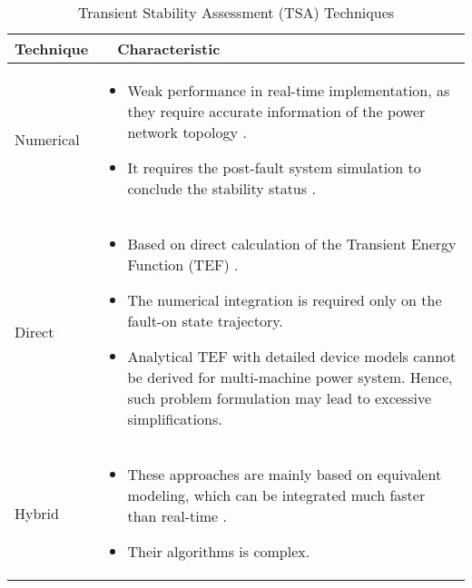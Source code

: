 \documentclass[journal]{IEEEtran}
\begin{document}
\begin{table*}[t]
\centering
	 \caption{Transient Stability Assessment (TSA) Techniques}
	 \footnotesize
\begin{tabular}{ p{0.35in} p{6.45in} }
\hline\hline
Technique &  $\quad$Characteristic \\ \hline
 \vspace{1mm}
 Numerical&  

\begin{itemize}
\item Weak performance in real-time implementation, as they require accurate information of the power network topology \cite{6465752}.
\item It requires the post-fault system simulation to conclude the stability status \cite{6902826}.
\end{itemize}	\\ [-1em] \hline 

\vspace{2.5mm}
Direct&  

\begin{itemize}
 \item Based on direct calculation of the Transient Energy Function (TEF) \cite{chiang1994bcu}. 
\item The numerical integration is required only on the fault-on state trajectory.
\item Analytical TEF with detailed device models cannot be derived for multi-machine power system. Hence, such problem formulation may lead to excessive simplifications.
\end{itemize}	\\ [-1em]\hline

\vspace{2mm}
Hybrid &  

\begin{itemize}
\item These approaches are mainly based on equivalent modeling, which can be integrated much faster than real-time \cite{ruiz2003comprehensive}.
\item Their algorithms is complex.
\end{itemize}	\\ [-1em]

\hline\hline 
	\end{tabular}
  \label{Tab:TSA}
\end{table*}
\end{document}
